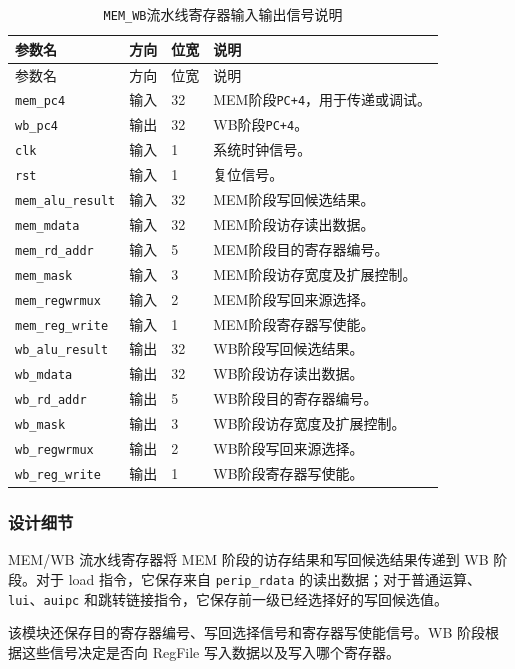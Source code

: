 \documentclass[12pt,a4paper]{ctexart}
\newcommand{\code}[1]{\texttt{#1}}
\begin{document}
{\footnotesize
\renewcommand{\arraystretch}{1.12}
\begin{longtable}{p{3.2cm}p{1.5cm}p{2.1cm}p{7.0cm}}
\caption{\code{MEM\_WB}流水线寄存器输入输出信号说明}\\
\toprule
参数名 & 方向 & 位宽 & 说明 \\
\midrule
\endfirsthead
\toprule
参数名 & 方向 & 位宽 & 说明 \\
\midrule
\endhead
\code{mem\_pc4} & 输入 & 32 & MEM阶段\code{PC+4}，用于传递或调试。 \\
\code{wb\_pc4} & 输出 & 32 & WB阶段\code{PC+4}。 \\
\code{clk} & 输入 & 1 & 系统时钟信号。 \\
\code{rst} & 输入 & 1 & 复位信号。 \\
\code{mem\_alu\_result} & 输入 & 32 & MEM阶段写回候选结果。 \\
\code{mem\_mdata} & 输入 & 32 & MEM阶段访存读出数据。 \\
\code{mem\_rd\_addr} & 输入 & 5 & MEM阶段目的寄存器编号。 \\
\code{mem\_mask} & 输入 & 3 & MEM阶段访存宽度及扩展控制。 \\
\code{mem\_regwrmux} & 输入 & 2 & MEM阶段写回来源选择。 \\
\code{mem\_reg\_write} & 输入 & 1 & MEM阶段寄存器写使能。 \\
\code{wb\_alu\_result} & 输出 & 32 & WB阶段写回候选结果。 \\
\code{wb\_mdata} & 输出 & 32 & WB阶段访存读出数据。 \\
\code{wb\_rd\_addr} & 输出 & 5 & WB阶段目的寄存器编号。 \\
\code{wb\_mask} & 输出 & 3 & WB阶段访存宽度及扩展控制。 \\
\code{wb\_regwrmux} & 输出 & 2 & WB阶段写回来源选择。 \\
\code{wb\_reg\_write} & 输出 & 1 & WB阶段寄存器写使能。 \\
\bottomrule
\end{longtable}
}

\subsubsection*{设计细节}

MEM/WB 流水线寄存器将 MEM 阶段的访存结果和写回候选结果传递到 WB 阶段。对于 load 指令，它保存来自 \code{perip\_rdata} 的读出数据；对于普通运算、\code{lui}、\code{auipc} 和跳转链接指令，它保存前一级已经选择好的写回候选值。

该模块还保存目的寄存器编号、写回选择信号和寄存器写使能信号。WB 阶段根据这些信号决定是否向 RegFile 写入数据以及写入哪个寄存器。
\end{document}
